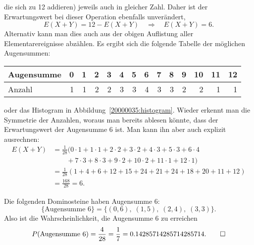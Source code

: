 \begin{loesung}
\begin{teilaufgaben}
die sich zu 12 addieren) jeweils auch in gleicher Zahl. Daher ist
der Erwartungswert bei dieser Operation ebenfalls unverändert,
\[
E(X+Y)= 12-E(X+Y)\quad\Rightarrow\quad E(X+Y)=6.
\]
Alternativ kann man dies auch aus der obigen Auflistung aller
Elementarereignisse abzählen. Es ergibt sich die folgende Tabelle
der möglichen Augensummen:
\begin{center}
\begin{tabular}{|l|rrrrrrrrrrrrr|}
\hline
Augensumme & 0& 1& 2& 3& 4& 5& 6& 7& 8& 9& 10& 11& 12\\
\hline
Anzahl     & 1& 1& 2& 2& 3& 3& 4& 3& 3& 2&  2&  1&  1\\
\hline
\end{tabular}
\end{center}
oder das Histogram in Abbildung~\ref{20000035:histogram}.
Wieder erkennt man die Symmetrie der Anzahlen, woraus man bereits
ablesen könnte, dass der Erwartungswert der Augensumme $6$ ist.
Man kann ihn aber auch explizit ausrechnen:
\begin{align*}
E(X+Y)&=
\frac1{28}(
0\cdot 1+
1\cdot 1+
2\cdot 2+
3\cdot 2+
4\cdot 3+
5\cdot 3+
6\cdot 4\\
&\qquad +
7\cdot 3+
8\cdot 3+
9\cdot 2+
10\cdot 2+
11\cdot 1+
12\cdot 1
)
\\
&=
\frac1{28}(1+4+6+12+15+24+21+24+18+20+11+12)\\
&=
\frac{168}{28}=6.
\end{align*}
\item
Die folgenden Dominosteine haben Augensumme 6:
\[
\{\text{Augensumme 6}\}
=\{
(0,6),\;
(1,5),\;
(2,4),\;
(3,3)\}.
\]
Also ist die Wahrscheinlichkeit, die Augensumme 6 zu erreichen
\[
P(\text{Augensumme 6})=\frac{4}{28}=\frac17=0.14285714285714285714.
\qedhere
\]
\end{teilaufgaben}
\end{loesung}

